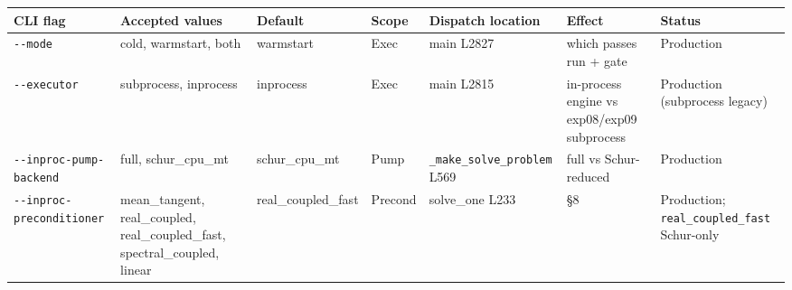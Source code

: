 \documentclass[
  10pt,
]{article}
\newcounter{none} %
\begin{document}
{\def\LTcaptype{none} %
\begin{longtable}[]{@{}
  >{\raggedright\arraybackslash}p{}
  >{\raggedright\arraybackslash}p{}
  >{\raggedright\arraybackslash}p{}
  >{\raggedright\arraybackslash}p{}
  >{\raggedright\arraybackslash}p{}
  >{\raggedright\arraybackslash}p{}
  >{\raggedright\arraybackslash}p{}@{}}
\toprule\noalign{}
\begin{minipage}[b]{\linewidth}\raggedright
CLI flag
\end{minipage} & \begin{minipage}[b]{\linewidth}\raggedright
Accepted values
\end{minipage} & \begin{minipage}[b]{\linewidth}\raggedright
Default
\end{minipage} & \begin{minipage}[b]{\linewidth}\raggedright
Scope
\end{minipage} & \begin{minipage}[b]{\linewidth}\raggedright
Dispatch location
\end{minipage} & \begin{minipage}[b]{\linewidth}\raggedright
Effect
\end{minipage} & \begin{minipage}[b]{\linewidth}\raggedright
Status
\end{minipage} \\
\midrule\noalign{}
\endhead
\bottomrule\noalign{}
\endlastfoot
\texttt{-\/-mode} & cold, warmstart, both & warmstart & Exec & main
L2827 & which passes run + gate & Production \\
\texttt{-\/-executor} & subprocess, inprocess & inprocess & Exec & main
L2815 & in-process engine vs exp08/exp09 subprocess & Production
(subprocess legacy) \\
\texttt{-\/-inproc-pump-backend} & full, schur\_cpu\_mt & schur\_cpu\_mt
& Pump & \texttt{\_make\_solve\_problem} L569 & full vs Schur-reduced &
Production \\
\texttt{-\/-inproc-preconditioner} & mean\_tangent, real\_coupled,
real\_coupled\_fast, spectral\_coupled, linear & real\_coupled\_fast &
Precond & solve\_one L233 & §8 & Production;
\texttt{real\_coupled\_fast} Schur-only \\

\end{longtable}}
\end{document}
